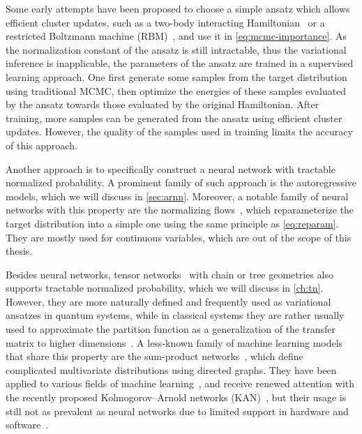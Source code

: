 Some early attempts have been proposed to choose a simple ansatz which allows efficient cluster updates, such as a two-body interacting Hamiltonian~\cite{liu2017self} or a restricted Boltzmann machine (RBM)~\cite{huang2017accelerated}, and use it in \cref{eq:mcmc-importance}. As the normalization constant of the ansatz is still intractable, thus the variational inference is inapplicable, the parameters of the ansatz are trained in a supervised learning approach. One first generate some samples from the target distribution using traditional MCMC, then optimize the energies of these samples evaluated by the ansatz towards those evaluated by the original Hamiltonian. After training, more samples can be generated from the ansatz using efficient cluster updates. However, the quality of the samples used in training limits the accuracy of this approach.

Another approach is to specifically construct a neural network with tractable normalized probability. A prominent family of such approach is the autoregressive models, which we will discuss in \cref{sec:arnn}. Moreover, a notable family of neural networks with this property are the normalizing flows~\cite{song2017nice, muller2019neural}, which reparameterize the target distribution into a simple one using the same principle as \cref{eq:reparam}. They are mostly used for continuous variables, which are out of the scope of this thesis.

Besides neural networks, tensor networks~\cite{bridgeman2017hand} with chain or tree geometries also supports tractable normalized probability, which we will discuss in \cref{ch:tn}. However, they are more naturally defined and frequently used as variational ansatzes in quantum systems, while in classical systems they are rather usually used to approximate the partition function as a generalization of the transfer matrix to higher dimensions~\cite{verstraete2006criticality, vanderstraeten2018residual, vanhecke2021solving, lanthier2024tensor}. A less-known family of machine learning models that share this property are the sum-product networks~\cite{poon2011sum}, which define complicated multivariate distributions using directed graphs. They have been applied to various fields of machine learning~\cite{sanchez2021sum}, and receive renewed attention with the recently proposed Kolmogorov--Arnold networks (KAN)~\cite{liu2024kan}, but their usage is still not as prevalent as neural networks due to limited support in hardware and software~\cite{barham2019machine}.
